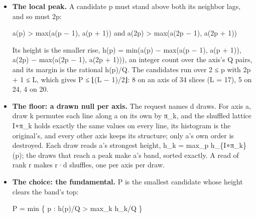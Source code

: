 \begin{itemize}
\item \textbf{The local peak.} A candidate p must stand above both its neighbor lags, and so must 2p:

a(p) > max(a(p − 1), a(p + 1))  and  a(2p) > max(a(2p − 1), a(2p + 1))

Its height is the smaller rise, h(p) = min(a(p) − max(a(p − 1), a(p + 1)), a(2p) − max(a(2p − 1), a(2p + 1))), an integer count over the axis's Q pairs, and its margin is the rational h(p)/Q. The candidates run over 2 ≤ p with 2p + 1 ≤ L, which gives P ≤ ⌊(L − 1)/2⌋: 8 on an axis of 34 slices (L = 17), 5 on 24, 4 on 20.
\item \textbf{The floor: a drawn null per axis.} The request names d draws. For axis a, draw k permutes each line along a on its own by π\_\allowbreak{}k, and the shuffled lattice I∘π\_\allowbreak{}k holds exactly the same values on every line, its histogram is the original's, and every other axis keeps its structure; only a's own order is destroyed. Each draw reads a's strongest height, h\_\allowbreak{}k = max\_\allowbreak{}p h\_\allowbreak{}\{I∘π\_\allowbreak{}k\}(p); the draws that reach a peak make a's band, sorted exactly. A read of rank r makes r·d shuffles, one per axis per draw.
\item \textbf{The choice: the fundamental.} P is the smallest candidate whose height clears the band's top:

P = min \{ p : h(p)/Q > max\_\allowbreak{}k h\_\allowbreak{}k/Q \}


\end{itemize}
